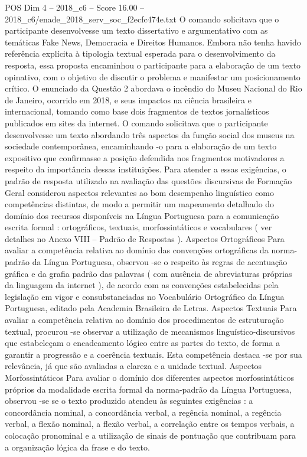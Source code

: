 \begin{textsample}{POS Dim 4 – 2018\_c6 – Score 16.00 – 2018\_c6/enade\_2018\_serv\_soc\_f2ecfc474e.txt}
O comando solicitava que o participante desenvolvesse um texto dissertativo e argumentativo com as temáticas Fake News, Democracia e Direitos Humanos.
Embora não tenha havido referência explícita à tipologia textual esperada para o desenvolvimento da resposta, essa proposta encaminhou o participante para a elaboração de um texto opinativo, com o objetivo de discutir o problema e manifestar um posicionamento crítico.
O enunciado da Questão 2 abordava o incêndio do Museu Nacional do Rio de Janeiro, ocorrido em 2018, e seus impactos na ciência brasileira e internacional, tomando como base dois fragmentos de textos jornalísticos publicados em sites da internet.
O comando solicitava que o participante desenvolvesse um texto abordando três aspectos da função social dos museus na sociedade contemporânea, encaminhando -o para a elaboração de um texto expositivo que confirmasse a posição defendida nos fragmentos motivadores a respeito da importância dessas instituições.
Para atender a essas exigências, o padrão de resposta utilizado na avaliação das questões discursivas de Formação Geral considerou aspectos relevantes ao bom desempenho linguístico como competências distintas, de modo a permitir um mapeamento detalhado do domínio dos recursos disponíveis na Língua Portuguesa para a comunicação escrita formal : ortográficos, textuais, morfossintáticos e vocabulares ( ver detalhes no Anexo VIII – Padrão de Respostas ).
Aspectos Ortográficos Para avaliar a competência relativa ao domínio das convenções ortográficas da norma-padrão da Língua Portuguesa, observou -se o respeito às regras de acentuação gráfica e da grafia padrão das palavras ( com ausência de abreviaturas próprias da linguagem da internet ), de acordo com as convenções estabelecidas pela legislação em vigor e consubstanciadas no Vocabulário Ortográfico da Língua Portuguesa, editado pela Academia Brasileira de Letras.
Aspectos Textuais Para avaliar a competência relativa ao domínio dos procedimentos de estruturação textual, procurou -se observar a utilização de mecanismos linguístico-discursivos que estabeleçam o encadeamento lógico entre as partes do texto, de forma a garantir a progressão e a coerência textuais.
Esta competência destaca -se por sua relevância, já que são avaliadas a clareza e a unidade textual.
Aspectos Morfossintáticos Para avaliar o domínio dos diferentes aspectos morfossintáticos próprios da modalidade escrita formal da norma-padrão da Língua Portuguesa, observou -se se o texto produzido atendeu às seguintes exigências : a concordância nominal, a concordância verbal, a regência nominal, a regência verbal, a flexão nominal, a flexão verbal, a correlação entre os tempos verbais, a colocação pronominal e a utilização de sinais de pontuação que contribuam para a organização lógica da frase e do texto.

\end{textsample}
